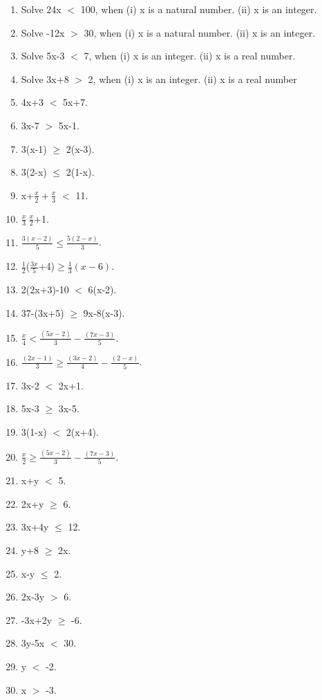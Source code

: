 \begin{enumerate}[label=\arabic*.,ref=\thesubsection.\theenumi]
	\item Solve 24x $<$ 100, when
	(i) x is a natural number.
	(ii) x is an integer.
	\item Solve -12x $>$ 30, when
	(i) x is a natural number.
	(ii) x is an integer.
	\item Solve 5x-3 $<$ 7, when
	(i) x is an integer.
	(ii) x is a real number.
	\item Solve 3x+8 $>$ 2, when
	(i) x is an integer.
	(ii) x is a real number
	
	\item 4x+3 $<$ 5x+7.
	\item 3x-7 $>$ 5x-1.
	\item 3(x-1) $\geq$ 2(x-3).
	\item 3(2-x) $\leq$ 2(1-x).
	\item x+$\frac{x}{2}+\frac{x}{3}$ $<$ 11.
	\item $\frac{x}{3}\>\frac{x}{2}$+1.
	\item $\frac{3(x-2)}{5}\leq\frac{5(2-x)}{3}$.
	\item $ \frac{1}{2}$($\frac{3x}{5}$+4)$\geq\frac{1}{3}(x-6)$.
	\item 2(2x+3)-10 $<$ 6(x-2).
	\item 37-(3x+5) $\geq$ 9x-8(x-3).
	\item $\frac{x}{4}<\frac{(5x-2)}{3}-\frac{(7x-3)}{5}$.
	\item $\frac{(2x-1)}{3}\geq\frac{(3x-2)}{4}-\frac{(2-x)}{5}$.
	
    \item 3x-2 $<$ 2x+1.
    \item 5x-3 $\geq$ 3x-5.
    \item 3(1-x) $<$ 2(x+4).
    \item $\frac{x}{2}\geq\frac{(5x-2)}{3}-\frac{(7x-3)}{5}$.

    \item x+y $<$ 5.
    \item 2x+y $\geq$ 6.    
    \item 3x+4y $\leq$ 12.
    \item y+8 $\geq$ 2x.
    \item x-y $\leq$ 2.
    \item 2x-3y $>$ 6.
    \item -3x+2y $\geq$ -6.
    \item 3y-5x $<$ 30.
    \item y $<$ -2.
    \item x $>$ -3.
    

\end{enumerate}
